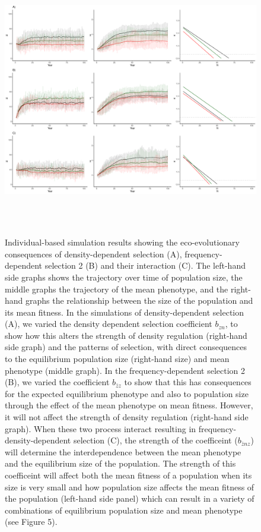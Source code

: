 \documentclass{article}
\begin{document}
\begin{figure}[h] 
	\centering
	\includegraphics[width=16cm, height=12cm]{Figures/Fig4.pdf}
	\caption{Individual-based simulation results showing the eco-evolutionary consequences of density-dependent selection (A), frequency-dependent selection 2 (B) and their interaction (C). The left-hand side graphs shows the trajectory over time of population size, the middle graphs the trajectory of the mean phenotype, and the right-hand graphs the relationship between the size of the population and its mean fitness. In the simulations of density-dependent selection (A), we varied the density dependent selection coefficient $b_{zn}$, to show how this alters the strength of density regulation (right-hand side graph) and the patterns of selection, with direct consequences to the equilibrium population size (right-hand size) and mean phenotype (middle graph). In the frequency-dependent selection 2  (B), we varied the coefficient $b_{\bar{z}z}$ to show that this has consequences for the expected equilibrium phenotype and also to population size through the effect of the mean phenotype on mean fitness. However, it will not affect the strength of density regulation (right-hand side graph).  When these two process interact resulting in frequency-density-dependent selection (C), the strength of the  coefficeint ($b_{\bar{z}nz}$) will determine the interdependence between the mean phenotype and the equilibrium size of the population. The strength of this coefficeint will affect both the mean fitness of a population when its size is very small and how population size affects the mean fitness of the population (left-hand side panel) which can result in a variety of combinations of equilibrium population size and mean phenotype (see Figure 5).} 
	\label{fig:sim3}
\end{figure}
\end{document}
